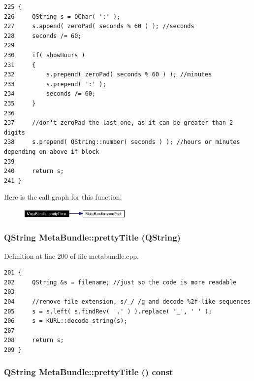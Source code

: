 \footnotesize\begin{verbatim}225 {
226     QString s = QChar( ':' );
227     s.append( zeroPad( seconds % 60 ) ); //seconds
228     seconds /= 60;
229 
230     if( showHours )
231     {
232         s.prepend( zeroPad( seconds % 60 ) ); //minutes
233         s.prepend( ':' );
234         seconds /= 60;
235     }
236 
237     //don't zeroPad the last one, as it can be greater than 2 digits
238     s.prepend( QString::number( seconds ) ); //hours or minutes depending on above if block
239 
240     return s;
241 }
\end{verbatim}\normalsize 


Here is the call graph for this function:\begin{figure}[H]
\begin{center}
\leavevmode
\includegraphics[width=155pt]{classMetaBundle_MetaBundlee2_cgraph}
\end{center}
\end{figure}
\subsubsection{\setlength{\rightskip}{0pt plus 5cm}QString Meta\-Bundle::pretty\-Title (QString)\hspace{0.3cm}{\tt  [static]}}\label{classMetaBundle_MetaBundlee4}




Definition at line 200 of file metabundle.cpp.



\footnotesize\begin{verbatim}201 {
202     QString &s = filename; //just so the code is more readable
203 
204     //remove file extension, s/_/ /g and decode %2f-like sequences
205     s = s.left( s.findRev( '.' ) ).replace( '_', ' ' );
206     s = KURL::decode_string(s);
207 
208     return s;
209 }
\end{verbatim}\normalsize 
{}
\subsubsection{\setlength{\rightskip}{0pt plus 5cm}QString Meta\-Bundle::pretty\-Title () const}\label{classMetaBundle_MetaBundlea17}




